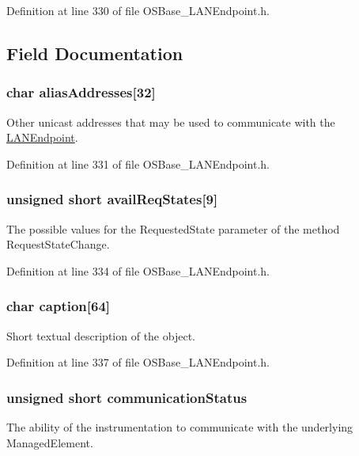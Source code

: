 Definition at line 330 of file OSBase\_\-LANEndpoint.h.

\subsection{Field Documentation}
\hypertarget{struct_l_a_n_endpoint_a6e449a03fbae5586b7160c04823501fc}{
\subsubsection[{aliasAddresses}]{\setlength{\rightskip}{0pt plus 5cm}char {\bf aliasAddresses}\mbox{[}32\mbox{]}}}
\label{struct_l_a_n_endpoint_a6e449a03fbae5586b7160c04823501fc}
Other unicast addresses that may be used to communicate with the \hyperlink{struct_l_a_n_endpoint}{LANEndpoint}. 

Definition at line 331 of file OSBase\_\-LANEndpoint.h.\hypertarget{struct_l_a_n_endpoint_a5a2be46ec1bec0e3aadd7ad393df3860}{
\subsubsection[{availReqStates}]{\setlength{\rightskip}{0pt plus 5cm}unsigned short {\bf availReqStates}\mbox{[}9\mbox{]}}}
\label{struct_l_a_n_endpoint_a5a2be46ec1bec0e3aadd7ad393df3860}
The possible values for the RequestedState parameter of the method RequestStateChange. 

Definition at line 334 of file OSBase\_\-LANEndpoint.h.\hypertarget{struct_l_a_n_endpoint_aedfd9c5424c9aa2ef6df1a16f9220d6f}{
\subsubsection[{caption}]{\setlength{\rightskip}{0pt plus 5cm}char {\bf caption}\mbox{[}64\mbox{]}}}
\label{struct_l_a_n_endpoint_aedfd9c5424c9aa2ef6df1a16f9220d6f}
Short textual description of the object. 

Definition at line 337 of file OSBase\_\-LANEndpoint.h.\hypertarget{struct_l_a_n_endpoint_a17887524776f566e094b52c5dd5ec5f5}{
\subsubsection[{communicationStatus}]{\setlength{\rightskip}{0pt plus 5cm}unsigned short {\bf communicationStatus}}}
\label{struct_l_a_n_endpoint_a17887524776f566e094b52c5dd5ec5f5}
The ability of the instrumentation to communicate with the underlying ManagedElement. 

